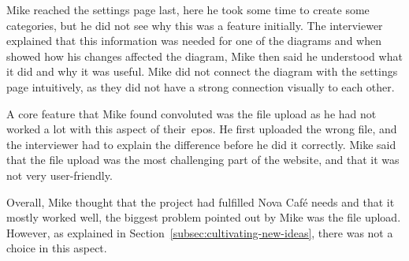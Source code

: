 Mike reached the settings page last, here he took some time to create some categories, but he did not see why this was
a feature initially.
The interviewer explained that this information was needed for one of the diagrams and when showed how his changes
affected the diagram, Mike then said he understood what it did and why it was useful.
Mike did not connect the diagram with the settings page intuitively,
as they did not have a strong connection visually to each other.

A core feature that Mike found convoluted was the file upload as he had not worked a lot with this aspect of
their~\acrshort{epos}.
He first uploaded the wrong file, and the interviewer had to explain the difference before he
did it correctly.
Mike said that the file upload was the most challenging part of the website, and that it was not very user-friendly.

Overall, Mike thought that the project had fulfilled Nova Café needs and that it mostly worked well, the biggest problem
pointed out by Mike was the file upload.
However, as explained in Section~\ref{subsec:cultivating-new-ideas}, there was not a choice in this aspect.

